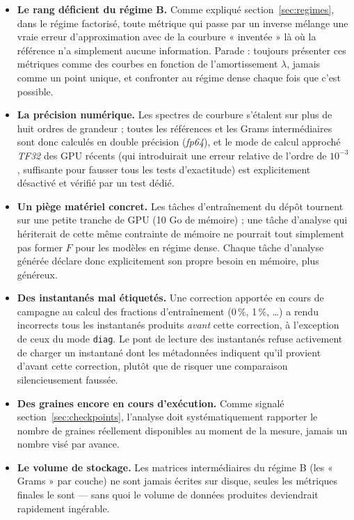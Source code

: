 \documentclass[11pt,a4paper]{article}
\newcommand{\eng}[1]{\emph{#1}}
\begin{document}
\begin{itemize}
\item \textbf{Le rang déficient du régime B.} Comme expliqué section~\ref{sec:regimes}, dans le
régime factorisé, toute métrique qui passe par un inverse mélange une vraie erreur d'approximation
avec de la courbure « inventée » là où la référence n'a simplement aucune information. Parade :
toujours présenter ces métriques comme des courbes en fonction de l'amortissement $\lambda$, jamais
comme un point unique, et confronter au régime dense chaque fois que c'est possible.
\item \textbf{La précision numérique.} Les spectres de courbure s'étalent sur plus de huit ordres de
grandeur ; toutes les références et les Grams intermédiaires sont donc calculés en double précision
(\eng{fp64}), et le mode de calcul approché \eng{TF32} des GPU récents (qui introduirait une erreur
relative de l'ordre de $10^{-3}$, suffisante pour fausser tous les tests d'exactitude) est
explicitement désactivé et vérifié par un test dédié.
\item \textbf{Un piège matériel concret.} Les tâches d'entraînement du dépôt tournent sur une petite
tranche de GPU (10 Go de mémoire) ; une tâche d'analyse qui hériterait de cette même contrainte de
mémoire ne pourrait tout simplement pas former $F$ pour les modèles en régime dense. Chaque tâche
d'analyse générée déclare donc explicitement son propre besoin en mémoire, plus généreux.
\item \textbf{Des instantanés mal étiquetés.} Une correction apportée en cours de campagne au calcul
des fractions d'entraînement (0\,\%, 1\,\%, \dots) a rendu incorrects tous les instantanés produits
\emph{avant} cette correction, à l'exception de ceux du mode \texttt{diag}. Le pont de lecture des
instantanés refuse activement de charger un instantané dont les métadonnées indiquent qu'il provient
d'avant cette correction, plutôt que de risquer une comparaison silencieusement faussée.
\item \textbf{Des graines encore en cours d'exécution.} Comme signalé section~\ref{sec:checkpoints},
l'analyse doit systématiquement rapporter le nombre de graines réellement disponibles au moment de
la mesure, jamais un nombre visé par avance.
\item \textbf{Le volume de stockage.} Les matrices intermédiaires du régime B (les « Grams » par
couche) ne sont jamais écrites sur disque, seules les métriques finales le sont — sans quoi le
volume de données produites deviendrait rapidement ingérable.
\end{itemize}
\end{document}
